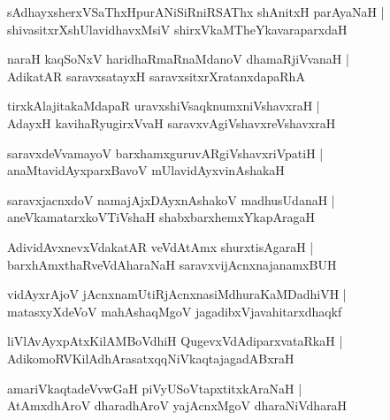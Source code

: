 \documentclass[twoside,12pt,openright]{book}
\newcounter{shloka}[chapter]
\begin{document}
\begin{shloka}%
sAdhayxsherxVSaThxHpurANiSiRniRSAThx shAnitxH parAyaNaH |\\
shivasitxrXshUlavidhavxMsiV shirxVkaMTheYkavaraparxdaH 
\end{shloka}

\begin{shloka}%
naraH kaqSoNxV haridhaRmaRnaMdanoV dhamaRjiVvanaH |\\
AdikatAR saravxsatayxH saravxsitxrXratanxdapaRhA 
\end{shloka}

\begin{shloka}%
tirxkAlajitakaMdapaR uravxshiVsaqknumxniVshavxraH |\\
AdayxH kavihaRyugirxVvaH saravxvAgiVshavxreVshavxraH 
\end{shloka}

\begin{shloka}%
saravxdeVvamayoV barxhamxguruvARgiVshavxriVpatiH |\\
anaMtavidAyxparxBavoV mUlavidAyxvinAshakaH 
\end{shloka}

\begin{shloka}%
saravxjacnxdoV namajAjxDAyxnAshakoV madhusUdanaH |\\
aneVkamatarxkoVTiVshaH shabxbarxhemxYkapAragaH 
\end{shloka}

\begin{shloka}%
AdividAvxnevxVdakatAR veVdAtAmx shurxtisAgaraH |\\
barxhAmxthaRveVdAharaNaH saravxvijAcnxnajanamxBUH
\end{shloka}

\begin{shloka}%
vidAyxrAjoV jAcnxnamUtiRjAcnxnasiMdhuraKaMDadhiVH |\\
matasxyXdeVoV mahAshaqMgoV jagadibxVjavahitarxdhaqkf 
\end{shloka}

\begin{shloka}%
liVlAvAyxpAtxKilAMBoVdhiH QugevxVdAdiparxvataRkaH |\\
AdikomoRVKilAdhArasatxqqNiVkaqtajagadABxraH 
\end{shloka}

\begin{shloka}%
amariVkaqtadeVvwGaH piVyUSoVtapxtitxkAraNaH |\\
AtAmxdhAroV dharadhAroV yajAcnxMgoV dharaNiVdharaH 
\end{shloka}
\end{document}
